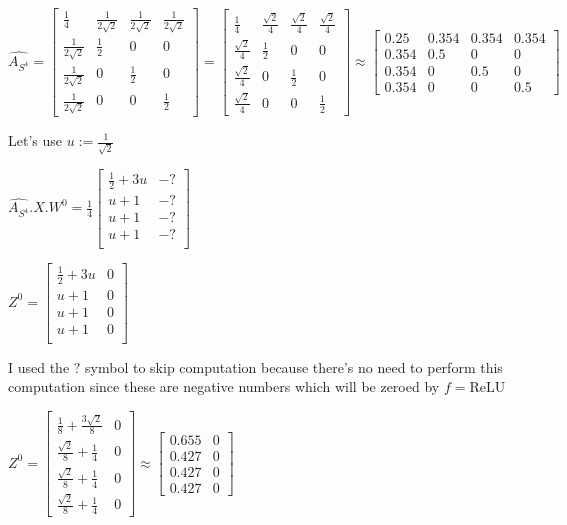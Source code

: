 \documentclass[a4paper]{article}
\begin{document}
$\hat{A_{S^4}} = \begin{bmatrix}
    \frac{1}{4} &  \frac{1}{2\sqrt{2}}  &  \frac{1}{2\sqrt{2}}  &  \frac{1}{2\sqrt{2}} \\
    \frac{1}{2\sqrt{2}}  &  \frac{1}{2}  &  0 &  0\\
    \frac{1}{2\sqrt{2}}  &  0 &  \frac{1}{2}  &  0\\
    \frac{1}{2\sqrt{2}}  &  0 &  0 &  \frac{1}{2} 
\end{bmatrix} =
\left[\begin{matrix}\frac{1}{4} & \frac{\sqrt{2}}{4} & \frac{\sqrt{2}}{4} & \frac{\sqrt{2}}{4}\\\frac{\sqrt{2}}{4} & \frac{1}{2} & 0 & 0\\\frac{\sqrt{2}}{4} & 0 & \frac{1}{2} & 0\\\frac{\sqrt{2}}{4} & 0 & 0 & \frac{1}{2}\end{matrix}\right]
\approx \begin{bmatrix}
    0.25 &  0.354 &  0.354 &  0.354\\
    0.354 &  0.5 &  0 &  0\\
    0.354 &  0 &  0.5 &  0\\
    0.354 &  0 &  0 &  0.5
\end{bmatrix}
$

Let's use $u := \frac{1}{\sqrt{2}}$

$\hat{A_{S^4}}.X. W^{0} = \frac{1}{4}\begin{bmatrix}
    \frac{1}{2} + 3u &  -? \\
    u+1 &  -? \\
    u+1 &  -? \\
    u+1 &  -? \\
\end{bmatrix}$

$Z^{0} = \begin{bmatrix}
    \frac{1}{2} + 3u & 0 \\
    u+1 &  0 \\
    u+1 &  0 \\
    u+1 &  0 \\
\end{bmatrix}
$


I used the $?$ symbol to skip computation because there's no need to perform this computation since these are negative numbers
which will be zeroed by $f=\text{ReLU}$


$Z^{0} = \left[\begin{matrix}\frac{1}{8} + \frac{3 \sqrt{2}}{8} & 0\\\frac{\sqrt{2}}{8} + \frac{1}{4} & 0\\\frac{\sqrt{2}}{8} + \frac{1}{4} & 0\\\frac{\sqrt{2}}{8} + \frac{1}{4} & 0\end{matrix}\right]
\approx \begin{bmatrix}
    0.655 &  0\\
    0.427 &  0\\
    0.427 &  0\\
    0.427 &  0
  \end{bmatrix}
$
\end{document}
